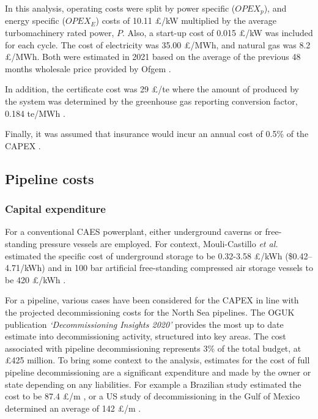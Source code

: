 \documentclass[preprint,12pt]{elsarticle}
\begin{document}
In this analysis, operating costs were split by power specific ($OPEX_p$), and energy specific ($OPEX_E$) costs of 10.11 £/kW multiplied by the average turbomachinery rated power, $P$. Also, a start-up cost of 0.015 £/kW \cite{Julch2015} was included for each cycle. The cost of electricity was 35.00 £/MWh, and natural gas was 8.2 £/MWh. Both were estimated in 2021 based on the average of the previous 48 months wholesale price provided by Ofgem \cite{OFGEMprices}. 

In addition, the  certificate cost was 29 £/te \cite{OFGEMprices} where the amount of  produced by the system was determined by the greenhouse gas reporting conversion factor, 0.184 te/MWh \cite{BEISCO2}.  

Finally, it was assumed that insurance would incur an annual cost of 0.5\% of the CAPEX \cite{Julch2015}.

\subsection{Pipeline costs}

\subsubsection{Capital expenditure}

For a conventional CAES powerplant, either underground caverns or free-standing pressure vessels are employed. For context, Mouli-Castillo \textit{et al.} estimated the specific cost of underground storage to be 0.32-3.58 £/kWh (\$0.42–4.71/kWh) \cite{Mouli-Castillo} and in 100 bar artificial free-standing compressed air storage vessels to be 420 £/kWh \cite{Chou}. 

For a pipeline, various cases have been considered for the CAPEX in line with the projected decommissioning costs for the North Sea pipelines. The OGUK publication \textit{‘Decommissioning Insights 2020’} \cite{OGUKdecom} provides the most up to date estimate into decommissioning activity, structured into key areas. The cost associated with pipeline decommissioning represents 3\% of the total budget, at £425 million. To bring some context to the analysis, estimates for the cost of full pipeline decommissioning are a significant expenditure and made by the owner or state depending on any liabilities. For example a Brazilian study estimated the cost to be 87.4 £/m \cite{Brazil}, or a US study of decommissioning in the Gulf of Mexico determined an average of 142 £/m \cite{KAISER2017167}.
\end{document}
